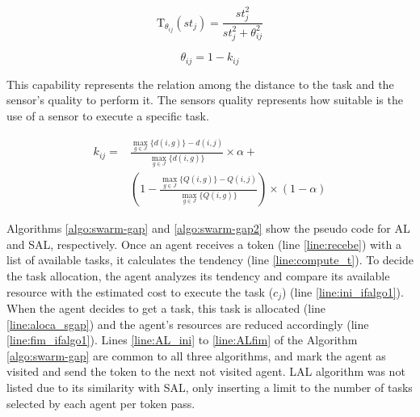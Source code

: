 \begin{equation} \label{eq:tendencia}
	\textrm{T}_{\theta_{ij}}(st_j) = \frac{st_{j}^2}{st_{j}^2 + \theta_{ij}^2}
\end{equation}

\begin{equation} \label{eq:limiar}
	\theta_{ij} = 1 - k_{ij}
\end{equation}

This capability represents the relation among the distance to the task and the sensor's quality to perform it. The sensors quality represents how suitable is the use of a sensor to execute a specific task.

\begin{equation} \label{eq:capability}
\begin{split}
k_{ij} = & \frac{\max_{g \in J} \{d(i,g)\} - d(i,j)}{\max_{g \in J} \{d(i,g)\}} \times \alpha + \\
& (1 - \frac{\max_{g \in J} \{Q(i,g)\} - Q(i,j)}{\max_{g \in J} \{Q(i,g)\}}) \times (1-\alpha)
\end{split}
\end{equation}

Algorithms \ref{algo:swarm-gap} and \ref{algo:swarm-gap2} show the pseudo code for AL and SAL, respectively. Once an agent receives a token (line \ref{line:recebe}) with a list of available tasks, it calculates the tendency (line \ref{line:compute_t}). To decide the task allocation, the agent analyzes its tendency and compare its available resource with the estimated cost to execute the task ($c_j$) (line \ref{line:ini_ifalgo1}). When the agent decides to get a task, this task is allocated (line \ref{line:aloca_sgap}) and the agent’s resources are reduced accordingly (line \ref{line:fim_ifalgo1}). Lines \ref{line:AL_ini} to \ref{line:ALfim} of the Algorithm \ref{algo:swarm-gap} are common to all three algorithms, and mark the agent as visited and send the token to the next not visited agent. LAL algorithm was not listed due to its similarity with SAL, only inserting a limit to the number of tasks selected by each agent per token pass. 

